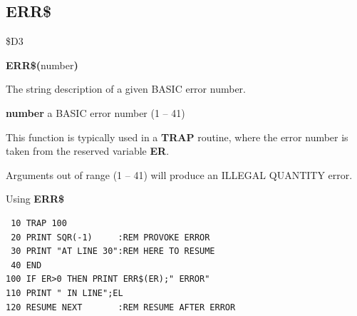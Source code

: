 \subsection{ERR\$}
\begin{description}[leftmargin=2cm,style=nextline]
\item [Token:] \$D3
\item [Format:] {\bf ERR\$(}number{\bf)}
\item [Returns:] The string description of a given BASIC error number.

   {\bf number} a BASIC error number (1 -- 41)

This function is typically used in a {\bf TRAP} routine,
where the error number is taken from the reserved variable {\bf ER}.

\item [Remarks:] Arguments out of range (1 -- 41) will
                 produce an ILLEGAL QUANTITY error.

\item [Example:] Using {\bf ERR\$}
\begin{tcolorbox}[colback=black,coltext=white]
\verbatimfont{\codefont}
\begin{verbatim}
 10 TRAP 100
 20 PRINT SQR(-1)     :REM PROVOKE ERROR
 30 PRINT "AT LINE 30":REM HERE TO RESUME
 40 END
100 IF ER>0 THEN PRINT ERR$(ER);" ERROR"
110 PRINT " IN LINE";EL
120 RESUME NEXT       :REM RESUME AFTER ERROR
\end{verbatim}
\end{tcolorbox}
\end{description}


\newpage
